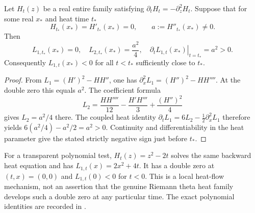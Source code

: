 \begin{lemma}
\label{lem:transversalheat}
Let $H_t(z)$ be a real entire family satisfying
$\partial_tH_t=-\partial_z^2H_t$.
Suppose that for some real $x_*$ and heat time $t_*$
\[
H_{t_*}(x_*)=H'_{t_*}(x_*)=0,\qquad
a:=H''_{t_*}(x_*)\ne0.
\]
Then
\[
L_{1,t_*}(x_*)=0,\quad
L_{2,t_*}(x_*)=\frac{a^2}{4},\quad
\left.\partial_t L_{1,t}(x_*)\right|_{t=t_*}=a^2>0.
\]
Consequently $L_{1,t}(x_*)<0$ for all $t<t_*$
sufficiently close to $t_*$.
\end{lemma}
\begin{proof}
From $L_1=(H')^2-HH''$,
one has $\partial_x^2L_1=(H'')^2-HH''''$.
At the double zero this equals $a^2$.
The coefficient formula
\[
L_2=\frac{HH''''}{12}
-\frac{H'H'''}3+\frac{(H'')^2}{4}
\]
gives $L_2=a^2/4$ there.
The coupled heat identity
$\partial_tL_1=6L_2-\tfrac12\partial_x^2L_1$
therefore yields
$6(a^2/4)-a^2/2=a^2>0$.
Continuity and differentiability in the heat parameter
give the stated strictly negative sign just before $t_*$.
\end{proof}
For a transparent polynomial test,
$H_t(z)=z^2-2t$ solves the same backward
heat equation and has
$L_{1,t}(x)=2x^2+4t$.
It has a double zero at $(t,x)=(0,0)$
and $L_{1,t}(0)<0$ for $t<0$.
This is a local heat-flow mechanism, not
an assertion that the genuine Riemann theta
heat family develops such a double zero
at any particular time. The exact polynomial
identities are recorded in
.

